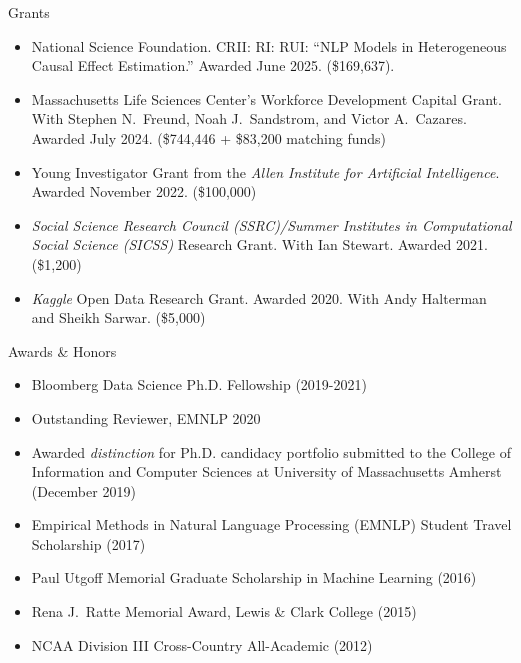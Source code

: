 \documentclass{resume} %
\begin{document}
\begin{rSection}{Grants}
\begin{itemize}
\item National Science Foundation. CRII: RI: RUI: ``NLP Models in Heterogeneous Causal Effect Estimation.'' Awarded June 2025. (\$169,637). 
\item Massachusetts Life Sciences Center's Workforce Development Capital Grant. With Stephen N.~Freund, Noah J.~Sandstrom, and Victor A.~Cazares. Awarded July 2024. (\$744,446 + \$83,200 matching funds)  
\item Young Investigator Grant from the \emph{Allen Institute for Artificial Intelligence}. Awarded November 2022. (\$100,000) 
\item  \emph{Social Science Research Council (SSRC)/Summer Institutes in Computational Social Science (SICSS)} Research Grant. With Ian Stewart. Awarded 2021. (\$1,200)
\item \emph{Kaggle} Open Data Research Grant. Awarded 2020. With Andy Halterman and Sheikh Sarwar. (\$5,000)
\end{itemize}

\end{rSection}

\newpage
\begin{rSection}{Awards \& Honors}
\begin{itemize}
\item Bloomberg Data Science Ph.D. Fellowship (2019-2021)  
\item Outstanding Reviewer, EMNLP 2020
\item Awarded \emph{distinction} for Ph.D. candidacy portfolio submitted to the College of Information and Computer Sciences at University of Massachusetts Amherst (December 2019) 
\item Empirical Methods in Natural Language Processing (EMNLP) Student Travel Scholarship (2017)
\item Paul Utgoff Memorial Graduate Scholarship in Machine Learning (2016) 
\item Rena J.~Ratte Memorial Award, Lewis \& Clark College (2015)
\item NCAA Division III Cross-Country All-Academic (2012) 
\end{itemize} 
\end{rSection}
\end{document}

